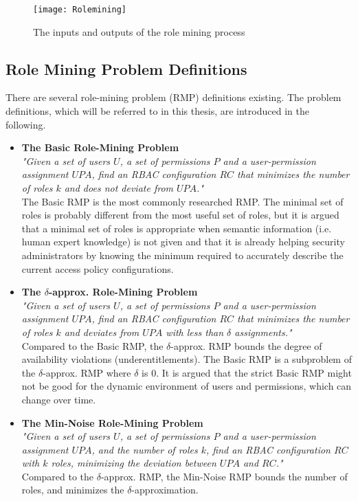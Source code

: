     \begin{figure}[H]
        \centering
        \texttt{[image: Rolemining]}
        \caption{The inputs and outputs of the role mining process}
        \label{fig:rolemining}
    \end{figure}
    
    \subsection{Role Mining Problem Definitions}
    \label{sec:roleMiningProblems}
    There are several role-mining problem (RMP) definitions existing. The problem definitions, which will be referred to in this thesis, are introduced in the following.
    
    \begin{itemize}
        \item \textbf{The Basic Role-Mining Problem}\cite{Vaidya:2007}\\
        \textit{"Given a set of users $U$, a set of permissions $P$ and a user-permission assignment $UPA$, find an RBAC configuration $RC$ that minimizes the number of roles $k$ and does not deviate from $UPA$."}\\
        The Basic RMP is the most commonly researched RMP. The minimal set of roles is probably different from the most useful set of roles, but it is argued that a minimal set of roles is appropriate when semantic information (i.e. human expert knowledge) is not given and that it is already helping security administrators by knowing the minimum required to accurately describe the current access policy configurations.
        
        \item \textbf{The $\delta$-approx. Role-Mining Problem}\cite{Vaidya:2007}\\
        \textit{"Given a set of users $U$, a set of permissions $P$ and a user-permission assignment $UPA$, find an RBAC configuration $RC$ that minimizes the number of roles $k$ and deviates from $UPA$ with less than $\delta$ assignments."}\\
        Compared to the Basic RMP, the $\delta$-approx. RMP bounds the degree of availability violations (underentitlements). The Basic RMP is a subproblem of the $\delta$-approx. RMP where $\delta$ is 0. It is argued that the strict Basic RMP might not be good for the dynamic environment of users and permissions, which can change over time.
        
        \item \textbf{The Min-Noise Role-Mining Problem}\cite{Vaidya:2007}\\
        \textit{"Given a set of users $U$, a set of permissions $P$ and a user-permission assignment $UPA$, and the number of roles $k$, find an RBAC configuration $RC$ with $k$ roles, minimizing the deviation between $UPA$ and $RC$."}\\
        Compared to the $\delta$-approx. RMP, the Min-Noise RMP bounds the number of roles, and minimizes the $\delta$-approximation.
        

\end{itemize}
